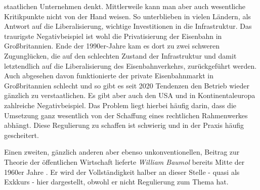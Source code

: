 staatlichen Unternehmen denkt. Mittlerweile kann man aber auch wesentliche Kritikpunkte nicht von der Hand weisen. So unterblieben in vielen Ländern, als Antwort auf die Liberalisierung, wichtige Investitionen in die Infrastruktur. Das traurigste Negativbeispiel ist wohl die Privatisierung der Eisenbahn in Großbritannien. Ende der 1990er-Jahre kam es dort zu zwei schweren Zugunglücken, die auf den schlechten Zustand der Infrastruktur und damit letztendlich auf die Liberalisierung des Eisenbahnverkehrs, zurückgeführt werden. Auch abgesehen davon funktionierte der private Eisenbahnmarkt in Großbritannien schlecht und so gibt es seit 2020 Tendenzen den Betrieb wieder gänzlich zu verstaatlichen. Es gibt aber auch den USA und in Kontinentaleuropa zahlreiche Negativbeispiel. Das Problem liegt hierbei häufig darin, dass die Umsetzung ganz wesentlich von der Schaffung eines rechtlichen Rahmenwerkes abhängt. Diese Regulierung zu schaffen ist schwierig und in der Praxis häufig gescheitert.

Einen zweiten, gänzlich anderen aber ebenso unkonventionellen, Beitrag zur Theorie der öffentlichen Wirtschaft lieferte \textit{William Baumol} bereits Mitte der 1960er Jahre \parencite{Baumol1965, Baumol1967}. Er wird der Vollständigkeit halber an dieser Stelle - quasi als Exkkurs - hier dargestellt, obwohl er nicht Regulierung zum Thema hat.


